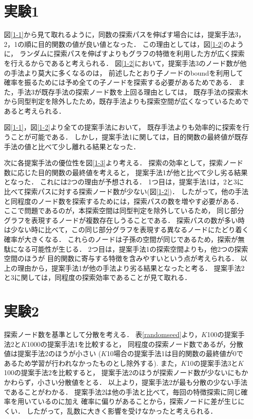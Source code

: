 \section{実験1}
図\ref{1-1}から見て取れるように，同数の探索パスを伸ばす場合には，提案手法3，2，1の順に目的関数の値が良い値となった．
この理由としては，図\ref{1-2}のように，
ランダムに探索パスを伸ばすよりもグラフの特徴を利用した方が広く探索を行えるからであると考えられる．
図\ref{1-2}において，提案手法3のノード数が他の手法より莫大に多くなるのは，
前述したとおり子ノードのboundを利用して確率を振るためには予め全ての子ノードを探索する必要があるためである．
また，手法3が既存手法の探索ノード数を上回る理由としては，
既存手法の探索木から同型判定を除外したため，既存手法よりも探索空間が広くなっているためであると考えられる．

図\ref{1-1}，図\ref{1-2}より全ての提案手法において，
既存手法よりも効率的に探索を行うことが可能である．
しかし，提案手法1に関しては，目的関数の最終値が既存手法の値と比べて少し離れる結果となった．

次に各提案手法の優位性を図\ref{1-3}より考える．
探索の効率として，探索ノード数に応じた目的関数の最終値を考えると，
提案手法1が他と比べて少し劣る結果となった．
これには2つの理由が予想される．
1つ目は，提案手法1は，2と3に比べて探索パスに対する探索ノード数が少ない(図\ref{1-2})．
したがって，他の手法と同程度のノード数を探索するためには，探索パスの数を増やす必要がある．
ここで問題であるのが，本探索空間は同型判定を除外しているため，
同じ部分グラフを表現するノードが複数存在しうることである．
探索パスの数が多い時は少ない時に比べて，この同じ部分グラフを表現する異なるノードにたどり着く確率が大きくなる．
これらのノードは子孫の空間が同じであるため，探索が無駄になる可能性が生じる．
2つ目は，提案手法1の探索空間よりも，他2つの探索空間のほうが
目的関数に寄与する特徴を含みやすいという点が考えられる．
以上の理由から，提案手法1が他の手法より劣る結果となったと考る．
提案手法2と3に関しては，同程度の探索効率であることが見て取れる．

\section{実験2}
探索ノード数を基準として分散を考える．
表\ref{randomseed}より，$K$100の提案手法2と$K$1000の提案手法1を比較すると，
同程度の探索ノード数であるが，分散値は提案手法2のほうが小さい
($K$10場合の提案手法1は目的関数の最終値が0であるため学習が行われなかったものとし除外する).
また，$K$10の提案手法3と$K$100の提案手法2を比較すると，
提案手法2のほうが探索ノード数が少ないにもかかわらず，小さい分散値をとる．
以上より，提案手法2が最も分散の少ない手法であることがわかる．
提案手法2は他の手法と比べて，毎回の特徴探索に同じ確率を用いているのに加え
確率に偏りがあることから，探索ノードに差が生じにくい．
したがって，乱数に大きく影響を受けなかったと考えられる．

